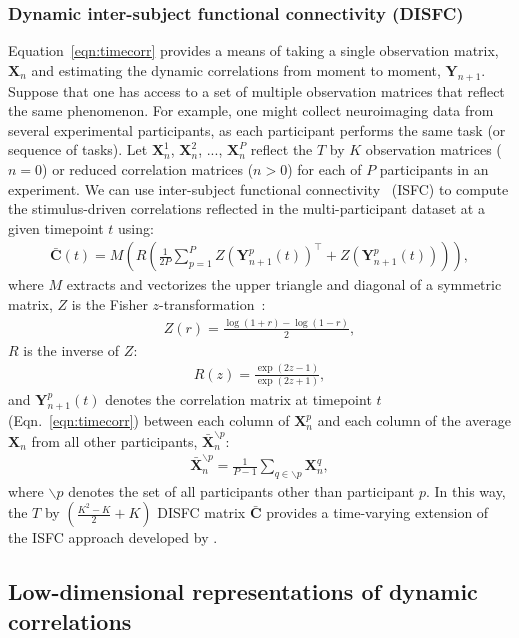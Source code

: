 \documentclass[english]{article}
\begin{document}
\subsubsection*{Dynamic inter-subject functional connectivity (DISFC)}
Equation~\ref{eqn:timecorr} provides a means of taking a single
observation matrix, $\mathbf{X}_n$ and estimating the dynamic
correlations from moment to moment, $\mathbf{Y}_{n+1}$.  Suppose that
one has access to a set of multiple observation matrices that reflect
the same phenomenon.  For example, one might collect neuroimaging data
from several experimental participants, as each participant performs
the same task (or sequence of tasks).  Let $\mathbf{X}_n^1$,
$\mathbf{X}_n^2$, ..., $\mathbf{X}_n^P$ reflect the $T$ by $K$
observation matrices ($n = 0$) or reduced correlation matrices
($n > 0$) for each of $P$ participants in an experiment.  We can use
inter-subject functional connectivity~\cite{SimoEtal16, SimoChan20}
(ISFC) to compute the stimulus-driven correlations reflected
in the multi-participant dataset at a given timepoint $t$ using:
\begin{align}
\bar{\mathbf{C}}(t) = M\left(R\left(\frac{1}{2P} \sum_{p=1}^P
  Z\left(\mathbf{Y}_{n+1}^p(t)\right)^\top + Z\left(\mathbf{Y}_{n+1}^p(t)\right)\right)\right),\label{eqn:disfc}
\end{align}
where $M$ extracts and vectorizes the upper triangle and diagonal of a symmetric
matrix, $Z$ is the Fisher $z$-transformation~\cite{Zar10}:
\begin{align}
Z(r) = \frac{\log(1+r) - \log(1-r)}{2},
\end{align}
$R$ is the inverse of $Z$:
\begin{align}
R(z) = \frac{\exp(2z - 1)}{\exp(2z + 1)},
\end{align}
and $\mathbf{Y}_{n+1}^p(t)$ denotes the correlation matrix at timepoint $t$
(Eqn.~\ref{eqn:timecorr}) between each column of $\mathbf{X}_n^p$ and each
column of the average $\mathbf{X}_n$ from all other
participants, $\bar{\mathbf{X}}_n^{ \backslash p}$:
\begin{align}
  \bar{\mathbf{X}}_n^{ \backslash p} = \frac{1}{P-1}\sum_{q \in
  \backslash p} \mathbf{X}_n^q,
\end{align}
where $\backslash p$ denotes the set of all participants other than
participant $p$. In this way, the $T$ by $\left( \frac{K^2 - K}{2} + K \right)$ DISFC
matrix $\bar{\mathbf{C}}$ provides a time-varying extension of the ISFC
approach developed by \cite{SimoEtal16}.

\subsection*{Low-dimensional representations of dynamic
  correlations}
\end{document}
